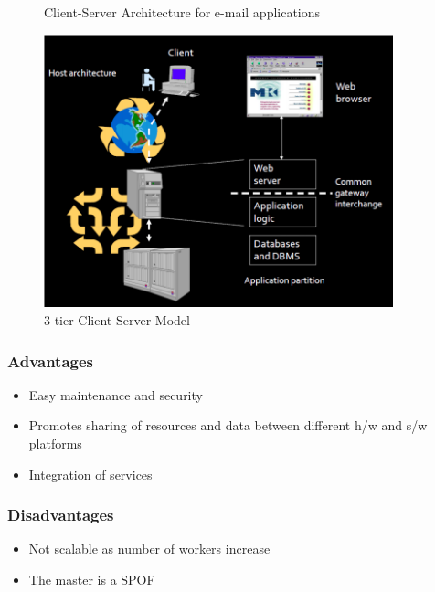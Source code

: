 \documentclass{article}
\begin{document}
\begin{figure}[!ht]
\begin{minipage}{0.45\textwidth}
        \caption{Client-Server Architecture for e-mail applications}
    \end{minipage}\hfill
    \begin{minipage}{0.45\textwidth}
        \centering
        \includegraphics[width=0.9\textwidth]{webapp.png} %
        \caption{3-tier Client Server Model}
    \end{minipage}
\end{figure}

\subsubsection{Advantages}
\begin{itemize}
    \item Easy maintenance and security
    
    \item Promotes sharing of resources and data between different h/w and s/w platforms
    
    \item Integration of services
\end{itemize}

\subsubsection{Disadvantages}
\begin{itemize}
    \item Not scalable as number of workers increase
    
    \item The master is a SPOF
\end{itemize}
\end{document}
